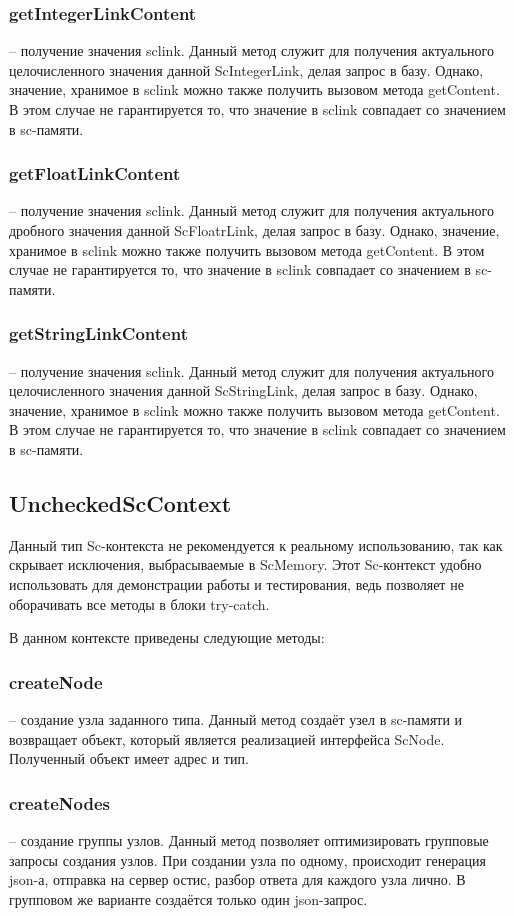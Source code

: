 \subsubsection {getIntegerLinkContent} -- получение значения sclink. Данный метод служит для получения актуального целочисленного значения данной ScIntegerLink, делая запрос в базу. Однако, значение, хранимое в sclink можно также получить вызовом метода getContent. В этом случае не гарантируется то, что значение в sclink совпадает со значением в sc-памяти.
\subsubsection {getFloatLinkContent} -- получение значения sclink. Данный метод служит для получения актуального дробного значения данной ScFloatrLink, делая запрос в базу. Однако, значение, хранимое в sclink можно также получить вызовом метода getContent. В этом случае не гарантируется то, что значение в sclink совпадает со значением в sc-памяти.
\subsubsection {getStringLinkContent} -- получение значения sclink. Данный метод служит для получения актуального целочисленного значения данной ScStringLink, делая запрос в базу. Однако, значение, хранимое в sclink можно также получить вызовом метода getContent. В этом случае не гарантируется то, что значение в sclink совпадает со значением в sc-памяти.


\subsection{UncheckedScContext}
Данный тип Sc-контекста не рекомендуется к реальному использованию, так как скрывает исключения, выбрасываемые в ScMemory. Этот Sc-контекст удобно использовать для демонстрации работы и тестирования, ведь позволяет не оборачивать все методы в блоки try-catch. 

В данном контексте приведены следующие методы:
\subsubsection{createNode} -- создание узла заданного типа. Данный метод создаёт узел в sc-памяти и возвращает объект, который является реализацией интерфейса ScNode. Полученный объект имеет адрес и тип.
\subsubsection {createNodes} -- создание группы узлов. Данный метод позволяет оптимизировать групповые запросы создания узлов. При создании узла по одному, происходит генерация json-а, отправка на сервер остис, разбор ответа для каждого узла лично. В групповом же варианте создаётся только один json-запрос. 
